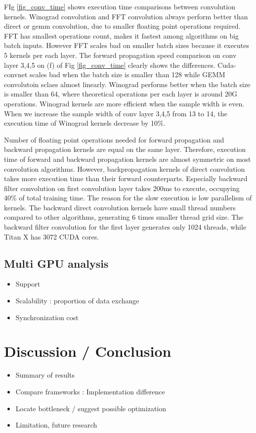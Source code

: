 FIg \ref{fig_conv_time} shows execution time comparisons between convolution kernels.
Winograd convolution and FFT convolution always perform better than direct or gemm convolution, due to smaller floating point operations required.
FFT has smallest operations count, makes it fastest among algorithms on big batch inputs.
However FFT scales bad on smaller batch sizes because it executes 5 kernels per each layer.
The forward propagation speed comparison on conv layer 3,4,5 on (f) of Fig \ref{fig_conv_time} clearly shows the differences.
Cuda-convnet scales bad when the batch size is smaller than 128 while GEMM convolutoin sclaes almost linearly.
Winograd performs better when the batch size is smaller than 64, where theoretical operations per each layer is around 20G operations.
Winograd kernels are more efficient when the sample width is even.
When we increase the sample width of conv layer 3,4,5 from 13 to 14, the execution time of Winograd kernels decrease by 10\%.

Number of floating point operations needed for forward propagation and backward propagation kernels are equal on the same layer.
Therefore, execution time of forward and backward propagation kernels are almost symmetric on most convolution algorithms.
However, backpropagation kernels of direct convolution takes more execution time than their forward counterparts.
Especially backward filter convolution on first convolution layer takes 200ms to execute, occupying 40\% of total training time.
The reason for the slow execution is low parallelism of kernels.
The backward direct convolution kernels have small thread numbers compared to other algorithms, generating 6 times smaller thread grid size.
The backward filter convolution for the first layer generates only 1024 threads, while Titan X has 3072 CUDA cores.




\subsection{Multi GPU analysis}

\begin{itemize}
  \item Support
  \item Scalability : proportion of data exchange
  \item Synchronization cost
\end{itemize}

\section{Discussion / Conclusion}

\begin{itemize}
  \item Summary of results
  \item Compare frameworks : Implementation difference
  \item Locate bottleneck / suggest possible optimization
  \item Limitation, future research
\end{itemize}
